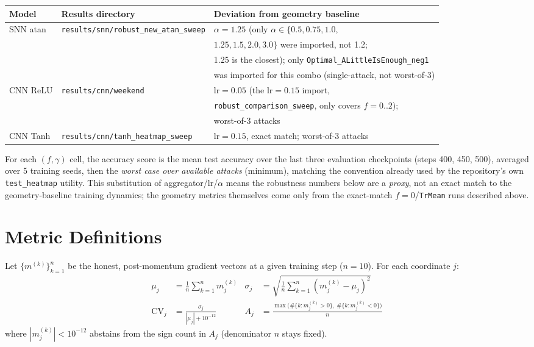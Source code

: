 \documentclass{article}
\begin{document}
\begin{center}
\begin{tabular}{@{}lll@{}}
\toprule
Model & Results directory & Deviation from geometry baseline \\
\midrule
SNN atan & \texttt{results/snn/robust\_new\_atan\_sweep} & $\alpha=1.25$ (only $\alpha\in\{0.5,0.75,1.0,$ \\
 & & $1.25,1.5,2.0,3.0\}$ were imported, not 1.2; \\
 & & 1.25 is the closest); only \texttt{Optimal\_ALittleIsEnough\_neg1} \\
 & & was imported for this combo (single-attack, not worst-of-3) \\
CNN ReLU & \texttt{results/cnn/weekend} & lr$=0.05$ (the lr$=0.15$ import, \\
 & & \texttt{robust\_comparison\_sweep}, only covers $f=0..2$); \\
 & & worst-of-3 attacks \\
CNN Tanh & \texttt{results/cnn/tanh\_heatmap\_sweep} & lr$=0.15$, exact match; worst-of-3 attacks \\
\bottomrule
\end{tabular}
\end{center}

For each $(f,\gamma)$ cell, the accuracy score is the mean test accuracy over the last three evaluation checkpoints (steps 400, 450, 500), averaged over 5 training seeds, then the \emph{worst case over available attacks} (minimum), matching the convention already used by the repository's own \texttt{test\_heatmap} utility. This substitution of aggregator/lr/$\alpha$ means the robustness numbers below are a \emph{proxy}, not an exact match to the geometry-baseline training dynamics; the geometry metrics themselves come only from the exact-match $f=0$/\texttt{TrMean} runs described above.

\section{Metric Definitions}

Let $\{m^{(k)}\}_{k=1}^{n}$ be the honest, post-momentum gradient vectors at a given training step ($n=10$). For each coordinate $j$:
\begin{align}
\mu_j &= \frac{1}{n}\sum_{k=1}^n m^{(k)}_j
& \sigma_j &= \sqrt{\frac{1}{n}\sum_{k=1}^n \left(m^{(k)}_j - \mu_j\right)^2} \\
\text{CV}_j &= \frac{\sigma_j}{|\mu_j| + 10^{-12}}
& A_j &= \frac{\max\!\big(\#\{k: m^{(k)}_j > 0\},\ \#\{k: m^{(k)}_j < 0\}\big)}{n}
\end{align}
where $|m^{(k)}_j| < 10^{-12}$ abstains from the sign count in $A_j$ (denominator $n$ stays fixed).
\end{document}

